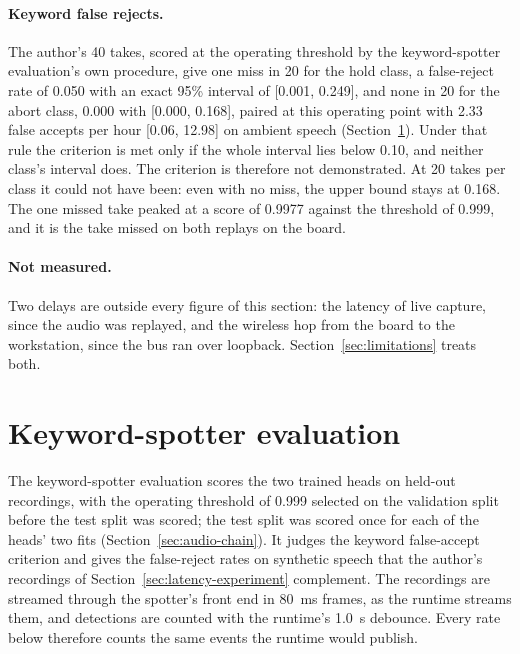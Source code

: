 \paragraph{Keyword false rejects.} The author's 40 takes, scored at the operating threshold by the
keyword-spotter evaluation's own procedure, give one miss in 20 for the hold class, a false-reject
rate of 0.050 with an exact 95\% interval of [0.001, 0.249], and none in 20 for the abort class,
0.000 with [0.000, 0.168], paired at this operating point with 2.33 false accepts per hour
[0.06, 12.98] on ambient speech (Section~\ref{sec:keyword-spotter-evaluation}). Under that rule
the criterion is met only if the whole interval lies below 0.10, and neither class's interval does.
The criterion is therefore not demonstrated. At 20 takes per class it could not have been: even with
no miss, the upper bound stays at 0.168. The one missed take peaked at a score of 0.9977 against the
threshold of 0.999, and it is the take missed on both replays on the board.

\paragraph{Not measured.} Two delays are outside every figure of this section: the latency of live
capture, since the audio was replayed, and the wireless hop from the board to the workstation,
since the bus ran over loopback. Section~\ref{sec:limitations} treats both.

\section{Keyword-spotter evaluation}
\label{sec:keyword-spotter-evaluation}
The keyword-spotter evaluation scores the two trained heads on held-out recordings, with the
operating threshold of 0.999 selected on the validation split before the test split was scored;
the test split was scored once for each of the heads' two fits (Section~\ref{sec:audio-chain}).
It judges the keyword false-accept criterion and gives the false-reject rates on synthetic speech
that the author's recordings of Section~\ref{sec:latency-experiment} complement.
The recordings are streamed through the spotter's front end in 80~ms frames, as the runtime
streams them, and detections are counted with the runtime's 1.0~s debounce. Every rate below
therefore counts the same events the runtime would publish.

